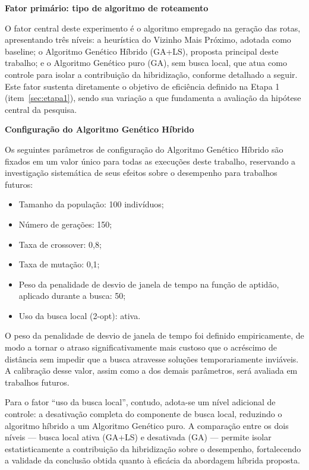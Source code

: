 \begin{alineas}
	\item \textbf{Fator primário: tipo de algoritmo de roteamento}

	O fator central deste experimento é o algoritmo empregado na geração das rotas,
	apresentando três níveis: a heurística do Vizinho Mais Próximo, adotada como
	baseline; o Algoritmo Genético Híbrido (GA+LS), proposta principal deste
	trabalho; e o Algoritmo Genético puro (GA), sem busca local, que atua como controle
	para isolar a contribuição da hibridização, conforme detalhado a seguir. Este fator
	sustenta diretamente o objetivo de eficiência definido na
	Etapa 1 (item~\ref{sec:etapa1}), sendo sua variação a que fundamenta a avaliação da
	hipótese central da pesquisa.

	\item \textbf{Configuração do Algoritmo Genético Híbrido}

	Os seguintes parâmetros de configuração do Algoritmo Genético Híbrido são fixados
	em um valor único para todas as execuções deste trabalho, reservando a investigação
	sistemática de seus efeitos sobre o desempenho para trabalhos futuros:

	\begin{itemize}
		\item Tamanho da população: 100 indivíduos;
		\item Número de gerações: 150;
		\item Taxa de crossover: 0,8;
		\item Taxa de mutação: 0,1;
		\item Peso da penalidade de desvio de janela de tempo na função de aptidão,
		aplicado durante a busca: 50;
		\item Uso da busca local (2-opt): ativa.
	\end{itemize}

	O peso da penalidade de desvio de janela de tempo foi definido empiricamente, de
	modo a tornar o atraso significativamente mais custoso que o acréscimo de distância
	sem impedir que a busca atravesse soluções temporariamente inviáveis. A calibração
	desse valor, assim como a dos demais parâmetros, será avaliada em trabalhos futuros.

	Para o fator ``uso da busca local'', contudo, adota-se um nível adicional de
	controle: a desativação completa do componente de busca local, reduzindo o
	algoritmo híbrido a um Algoritmo Genético puro. A comparação entre os dois níveis
	--- busca local ativa (GA+LS) e desativada (GA) --- permite isolar estatisticamente
	a contribuição da hibridização sobre o desempenho, fortalecendo a validade da
	conclusão obtida quanto à eficácia da abordagem híbrida proposta.


\end{alineas}
